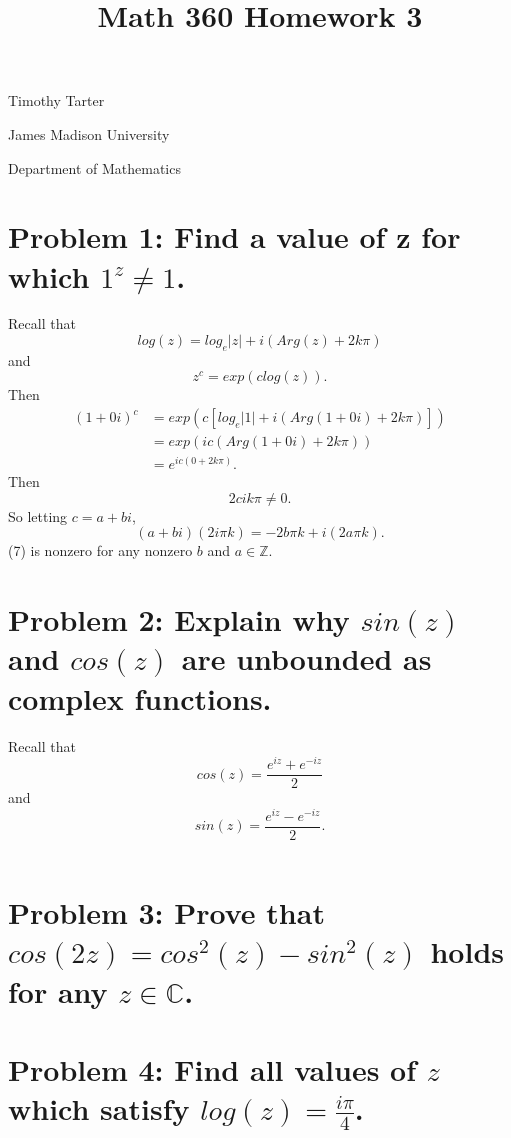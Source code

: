 \documentclass[12 pt]{article}        	%
\title{Math 360 Homework 3}
\newcommand{\z}{\mathbb Z}
\newcommand{\complex}{\mathbb C}
\begin{document}
\maketitle
\begin{center}
    Timothy Tarter

    James Madison University

    Department of Mathematics
\end{center}

\section*{Problem 1: Find a value of z for which $1^z \neq 1$.}
Recall that 
\begin{equation}
    log(z) = log_e|z|+i(Arg(z)+2k\pi)
\end{equation}
and
\begin{equation}
    z^c = exp(clog(z)).
\end{equation}
Then
\begin{align}
    (1+0i)^c &= exp(c[log_e|1|+i(Arg(1+0i)+2k\pi)])\\
    &=exp(ic(Arg(1+0i)+2k\pi))\\
    &=e^{ic(0+2k\pi)}.
\end{align}
Then
\begin{equation}
    2cik\pi \neq 0.
\end{equation}
So letting $c=a+bi$,
\begin{equation}
    (a+bi)(2i\pi k) = -2b\pi k+i(2a\pi k).
\end{equation}
(7) is nonzero for any nonzero $b$ and $a \in \z$.


\section*{Problem 2: Explain why $sin(z)$ and $cos(z)$ are unbounded as complex functions.}
Recall that 
\begin{equation}
    cos(z) = \frac{e^{iz}+e^{-iz}}{2}
\end{equation}
and
\begin{equation}
    sin(z) = \frac{e^{iz}-e^{-iz}}{2}.
\end{equation}

\begin{equation}
\end{equation}


\section*{Problem 3: Prove that $cos(2z) = cos^2(z) - sin^2(z)$ holds for any $z\in \complex$.}
\section*{Problem 4: Find all values of $z$ which satisfy $log(z) = \frac{i\pi}{4}$.}
\end{document}
